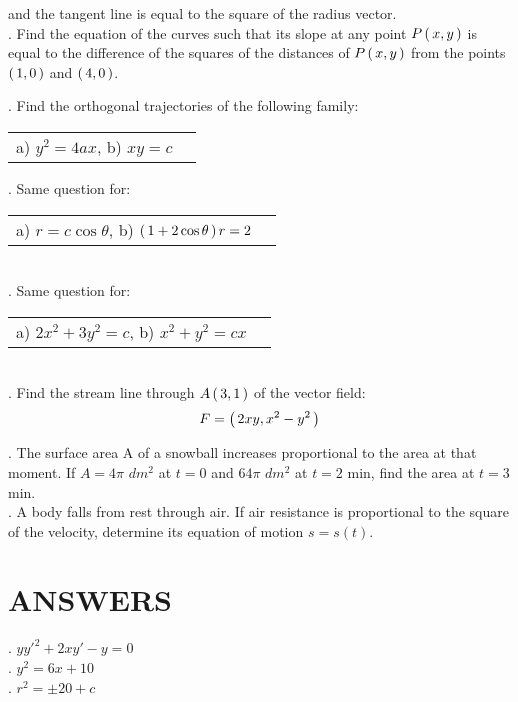\documentclass[11pt]{amsbook}
\begin{document}

\noindent and the tangent line is equal to the square of the radius 
vector. \\
. Find the equation of the curves such that its slope at any 
point $P \left( \, x,y \, \right) $ is equal to the difference of the squares of the distances of $P \left( \, x,y \, \right) $ from the points $ \left( \, 1,0 \, \right) $ and $ \left( \, 4,0 \, \right) $.

. Find the orthogonal trajectories of the following family:\\
\begin{tabular}{cc}
a) $y^2=4ax$, \quad \quad \quad \quad 
b) $xy=c$
\end{tabular}


. Same question for:\\
\begin{tabular}{cc}
a) $r= c \cos\theta$, \quad \quad \quad \quad 
b) $ \left( \, 1+2\cos\theta \, \right) r=2$
\end{tabular}\\
. Same question for:\\
\begin{tabular}{cc}
a) $2x^2+3y^2=c$,  \quad \quad 
b) $x^2+y^2=cx$
\end{tabular}\\
. Find the stream line through $A \left( \, 3,1 \, \right) $ of the vector field:
$$
F= \left( \, 2xy,x^2-y^2 \, \right) 
$$

. The surface area A of a snowball increases proportional to the area at that moment. If $A=4\pi$ $dm^2$ at $t= 0$ and $64\pi$  $dm^2$ at $t = 2$ min, find the area at $t = 3$ min.\\
.  A body falls from rest through air. If air resistance is proportional to the square of the velocity, determine its equation of motion $s=s(t)$. 
\section*{ANSWERS}
. $yy\prime^2+2xy\prime-y=0$
\\ . $y^2=6x+10$
\\ . $r^2=\pm20+c$
\end{document}
